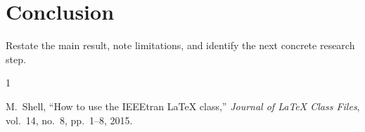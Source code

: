 \documentclass[journal,10pt]{IEEEtran}
\begin{document}
\section{Conclusion}
Restate the main result, note limitations, and identify the next concrete
research step.

\begin{thebibliography}{1}

M.~Shell, ``How to use the IEEEtran LaTeX class,'' \emph{Journal of LaTeX Class Files}, vol.~14, no.~8, pp.~1--8, 2015.

\end{thebibliography}
\end{document}
